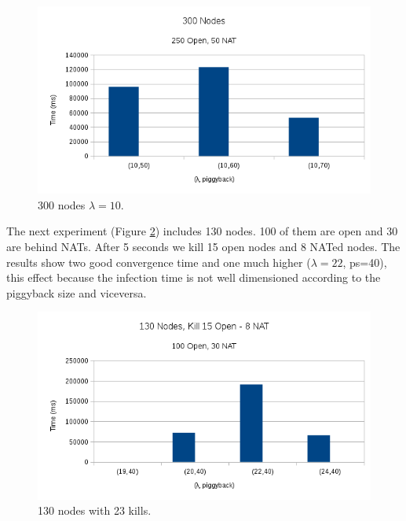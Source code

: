 \documentclass[10pt,a4paper]{proc}
\begin{document}
\begin{figure}
\centering
\includegraphics[scale=0.5]{metrics/allAliveFixedLamda.png}
\caption{300 nodes $\lambda=10$.}
\label{allAliveFixedLamda}
\end{figure}

The next experiment (Figure \ref{kill15Open}) includes 130 nodes. 100 of them are open and 30 are behind NATs. After 5 seconds we kill 15 open nodes and 8 NATed nodes. The results show two good convergence time and one much higher ($\lambda=22$, ps=40), this effect because the infection time is not well dimensioned according to the piggyback size and viceversa.

\begin{figure}
\centering
\includegraphics[scale=0.5]{metrics/kill15Open.png}
\caption{130 nodes with 23 kills.}
\label{kill15Open}
\end{figure}
\end{document}
